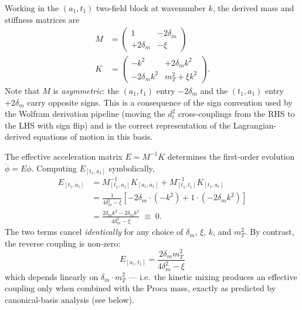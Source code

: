 Working in the $(a_1, t_1)$ two-field block at wavenumber $k$, the
derived mass and stiffness matrices are
\begin{align}
  M &= \begin{pmatrix} 1 & -2\delta_m \\ +2\delta_m & -\xi \end{pmatrix}
  \label{eq:dp-M} \\
  K &= \begin{pmatrix} -k^2 & +2\delta_m k^2 \\
       -2\delta_m k^2 & m_T^2 + \xi k^2 \end{pmatrix}.
  \label{eq:dp-K}
\end{align}
Note that $M$ is \emph{asymmetric}: the $(a_1, t_1)$ entry
$-2\delta_m$ and the $(t_1, a_1)$ entry $+2\delta_m$ carry opposite
signs. This is a consequence of the sign convention used by the
Wolfram derivation pipeline (moving the $d^2_t$ cross-couplings from
the RHS to the LHS with sign flip) and is the correct representation
of the Lagrangian-derived equations of motion in this basis.

The effective acceleration matrix $E = M^{-1} K$ determines the
first-order evolution $\ddot{\phi} = E \phi$. Computing
$E_{[t_1, a_1]}$ symbolically,
\begin{align}
  E_{[t_1, a_1]}
  &= M^{-1}_{[t_1, a_1]} K_{[a_1, a_1]}
     + M^{-1}_{[t_1, t_1]} K_{[t_1, a_1]} \nonumber\\
  &= \frac{1}{4\delta_m^2 - \xi}\!\left[
       -2\delta_m \cdot (-k^2)
       + 1 \cdot (-2\delta_m k^2) \right] \nonumber\\
  &= \frac{2\delta_m k^2 - 2\delta_m k^2}{4\delta_m^2 - \xi}
   \;\equiv\; 0 .
  \label{eq:dp-cancellation}
\end{align}
The two terms cancel \emph{identically} for any choice of
$\delta_m$, $\xi$, $k$, and $m_T^2$. By contrast, the reverse
coupling is non-zero:
\begin{equation}
  E_{[a_1, t_1]}
  = \frac{2\delta_m m_T^2}{4\delta_m^2 - \xi}
  \label{eq:dp-eff-at}
\end{equation}
which depends linearly on $\delta_m \cdot m_T^2$ --- i.e.\ the
kinetic mixing produces an effective coupling only when combined
with the Proca mass, exactly as predicted by canonical-basis
analysis (see below).


